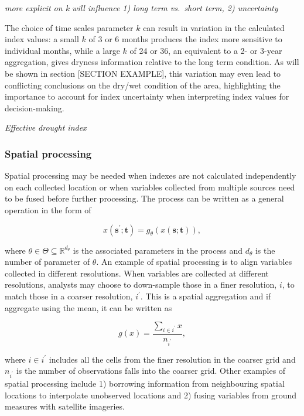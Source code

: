 \documentclass[
]{interact}
\begin{document}
\emph{more explicit on k will influence 1) long term vs.~short term, 2)
uncertainty}

The choice of time scales parameter \(k\) can result in variation in the
calculated index values: a small \(k\) of 3 or 6 months produces the
index more sensitive to individual months, while a large \(k\) of 24 or
36, an equivalent to a 2- or 3-year aggregation, gives dryness
information relative to the long term condition. As will be shown in
section {[}SECTION EXAMPLE{]}, this variation may even lead to
conflicting conclusions on the dry/wet condition of the area,
highlighting the importance to account for index uncertainty when
interpreting index values for decision-making.

\emph{Effective drought index}

\hypertarget{spatial-processing}{%
\subsubsection{Spatial processing}\label{spatial-processing}}

Spatial processing may be needed when indexes are not calculated
independently on each collected location or when variables collected
from multiple sources need to be fused before further processing. The
process can be written as a general operation in the form of

\begin{equation}
x(\mathbf{s}^\prime;\mathbf{t}) = g_{\mathcal{\theta}}(x(\mathbf{s};\mathbf{t})),
\end{equation}

where \(\theta \in \Theta \subseteq \mathbb{R}^{d_{\theta}}\) is the
associated parameters in the process and \(d_{\theta}\) is the number of
parameter of \(\theta\). An example of spatial processing is to align
variables collected in different resolutions. When variables are
collected at different resolutions, analysts may choose to down-sample
those in a finer resolution, \(i\), to match those in a coarser
resolution, \(i^\prime\). This is a spatial aggregation and if aggregate
using the mean, it can be written as

\begin{equation}
g(x) = \frac{\sum_{i \in i^\prime}x}{n_{i^\prime}},
\end{equation}

where \(i \in i^\prime\) includes all the cells from the finer
resolution in the coarser grid and \(n_{i^\prime}\) is the number of
observations falls into the coarser grid. Other examples of spatial
processing include 1) borrowing information from neighbouring spatial
locations to interpolate unobserved locations and 2) fusing variables
from ground measures with satellite imageries.
\end{document}
